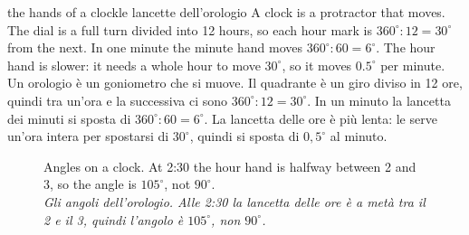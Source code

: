 \documentclass[10pt,a4paper,oneside]{book}
\newcommand{\bicap}[2]{\caption{#1\\{\color{itgreen}\itshape #2}}}
\begin{document}
\begin{anchor}{the hands of a clock}{le lancette dell'orologio}
A clock is a protractor that moves. The dial is a full turn divided into 12 hours, so each hour mark is $360^\circ : 12 = 30^\circ$ from the next. In one minute the minute hand moves $360^\circ : 60 = 6^\circ$. The hour hand is slower: it needs a whole hour to move $30^\circ$, so it moves $0.5^\circ$ per minute.
\tcblower
Un orologio è un goniometro che si muove. Il quadrante è un giro diviso in 12 ore, quindi tra un'ora e la successiva ci sono $360^\circ : 12 = 30^\circ$. In un minuto la lancetta dei minuti si sposta di $360^\circ : 60 = 6^\circ$. La lancetta delle ore è più lenta: le serve un'ora intera per spostarsi di $30^\circ$, quindi si sposta di $0{,}5^\circ$ al minuto.
\end{anchor}

\begin{figure}[htbp]
\centering
\bicap{Angles on a clock. At 2:30 the hour hand is halfway between 2 and 3, so the angle is $105^\circ$, not $90^\circ$.}%
      {Gli angoli dell'orologio. Alle 2:30 la lancetta delle ore è a metà tra il 2 e il 3, quindi l'angolo è $105^\circ$, non $90^\circ$.}
\label{fig:clocks}
\end{figure}
\end{document}
